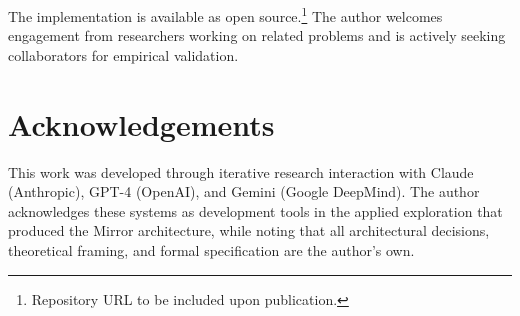 \documentclass[11pt,a4paper]{article}
\begin{document}
The implementation is available as open source.\footnote{Repository URL to be included upon publication.}
The author welcomes engagement from researchers working on related problems and is actively seeking collaborators for empirical validation.

\section*{Acknowledgements}

This work was developed through iterative research interaction with Claude (Anthropic), GPT-4 (OpenAI), and Gemini (Google DeepMind).
The author acknowledges these systems as development tools in the applied exploration that produced the Mirror architecture, while noting that all architectural decisions, theoretical framing, and formal specification are the author's own.


\end{document}
